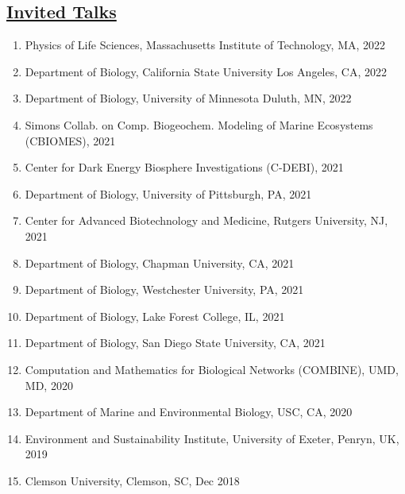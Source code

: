 \documentclass[]{res}
\begin{document}
\begin{resume}
   \section{\underline{Invited Talks}} \vspace{2mm}
    \begin{enumerate}[leftmargin=*]
\item Physics of Life Sciences, Massachusetts Institute of Technology, MA, 2022
\item Department of Biology, California State University Los Angeles, CA, 2022
\item Department of Biology, University of Minnesota Duluth, MN, 2022
\item Simons Collab. on Comp. Biogeochem. Modeling of Marine Ecosystems (CBIOMES), 2021
\item Center for Dark Energy Biosphere Investigations (C-DEBI), 2021
\item Department of Biology, University of Pittsburgh, PA, 2021
\item Center for Advanced Biotechnology and Medicine, Rutgers University, NJ, 2021
\item Department of Biology, Chapman University, CA, 2021
\item Department of Biology, Westchester University, PA, 2021
\item Department of Biology, Lake Forest College, IL, 2021
\item Department of Biology, San Diego State University, CA, 2021
\item Computation and Mathematics for Biological Networks (COMBINE), UMD, MD, 2020
\item Department of Marine and Environmental Biology, USC, CA, 2020
\item Environment and Sustainability Institute, University of Exeter, Penryn, UK, 2019
\item Clemson University, Clemson, SC, Dec 2018
\end{enumerate}




\end{resume}
\end{document}
